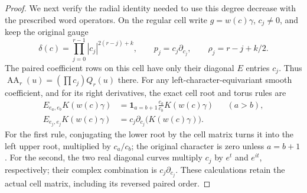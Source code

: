 \begin{proof}
We next verify the radial identity needed to use this degree
decrease with the prescribed word operators.  On the regular
cell write $g=w(c)\gamma$, $c_j\ne0$, and keep the original gauge
\[
 \delta(c)=\prod_{j=0}^{r-1}|c_j|^{2(r-j)+k},\qquad
 p_j=c_j\partial_{c_j},\qquad
 \rho_j=r-j+k/2.
\]
The paired coefficient rows on this cell have only their
diagonal $E$ entries $c_j$.  Thus
$\operatorname{AA}_r(u)=(\prod c_j)Q_r(u)$ there.
For any left-character-equivariant smooth coefficient, and for
its right derivatives, the exact cell root and torus rules are
\begin{align*}
 E_{e_a,e_b}K(w(c)\gamma)
   &=\mathbf1_{a=b+1}\frac{c_a}{c_b}K(w(c)\gamma)
                                             &&(a>b),\\
 E_{e_j,e_j}K(w(c)\gamma)
   &=c_j\partial_{c_j}\bigl(K(w(c)\gamma)\bigr).
\end{align*}
For the first rule, conjugating the lower root by the cell
matrix turns it into the left upper root, multiplied by
$c_a/c_b$; the original character is zero unless $a=b+1$.
For the second, the two real diagonal curves multiply $c_j$
by $e^t$ and $e^{it}$, respectively; their complex combination
is $c_j\partial_{c_j}$.  These calculations retain the actual
cell matrix, including its reversed paired order.


\end{proof}
